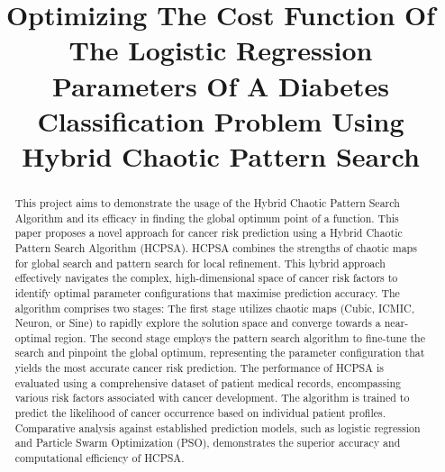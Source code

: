 \documentclass[conference]{IEEEtran}
\begin{document}
\title{Optimizing The Cost Function Of The Logistic Regression Parameters Of A Diabetes Classification Problem Using Hybrid Chaotic Pattern Search}

\author{
\and
{}
\and
{}
}

\maketitle

\begin{abstract}
This project aims to demonstrate the usage of the Hybrid Chaotic Pattern Search Algorithm\cite{raniAnalysisChaoticMaps2023} and its efficacy in finding the global optimum point of a function.
This paper proposes a novel approach for cancer risk prediction using a Hybrid Chaotic Pattern Search Algorithm (HCPSA). HCPSA combines the strengths of chaotic maps for global search and pattern search for local refinement. This hybrid approach effectively navigates the complex, high-dimensional space of cancer risk factors to identify optimal parameter configurations that maximise prediction accuracy. The algorithm comprises two stages: The first stage utilizes chaotic maps (Cubic, ICMIC, Neuron, or Sine) to rapidly explore the solution space and converge towards a near-optimal region. The second stage employs the pattern search algorithm to fine-tune the search and pinpoint the global optimum, representing the parameter configuration that yields the most accurate cancer risk prediction.
The performance of HCPSA is evaluated using a comprehensive dataset of patient medical records, encompassing various risk factors associated with cancer development.
 The algorithm is trained to predict the likelihood of cancer occurrence based on individual patient profiles. Comparative analysis against established prediction models, such as logistic regression and Particle Swarm Optimization (PSO), demonstrates the superior accuracy and computational efficiency of HCPSA.
\end{abstract}
\end{document}
